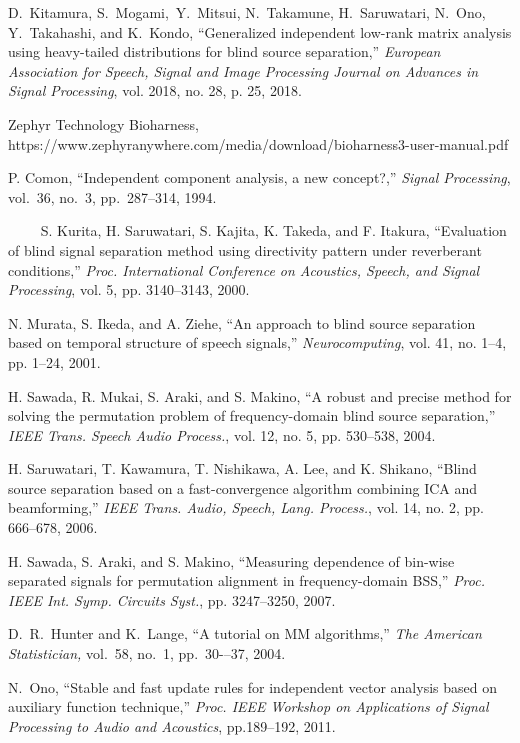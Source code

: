 \documentclass[honka]{nitkagawathesis}%
\begin{document}
\begin{thebibliography}{99}
  D.~Kitamura, S.~Mogami,~Y.~Mitsui, N.~Takamune, H.~Saruwatari, N.~Ono, Y.~Takahashi, and K.~Kondo, 
  ``Generalized independent low-rank matrix analysis using heavy-tailed distributions for blind source separation,''
  {\em European Association for Speech, Signal and Image Processing Journal on Advances in Signal Processing}, vol. 2018, no. 28, p. 25, 2018. 

   Zephyr Technology Bioharness, https://www.zephyranywhere.com/media/download/bioharness3-user-manual.pdf

    P. Comon, ``Independent component analysis, a new concept?,'' 
    {\em Signal Processing}, vol.~36, no.~3, pp.~287--314, 1994.

    S. Kurita, H. Saruwatari, S. Kajita, K. Takeda, and F. Itakura, ``Evaluation of blind signal separation method using directivity pattern under reverberant conditions,'' {\em Proc. International Conference on Acoustics, Speech, and Signal Processing}, vol. 5, pp. 3140--3143, 2000.

    N. Murata, S. Ikeda, and A. Ziehe, ``An approach to blind source separation based on temporal structure of speech signals,'' {\em Neurocomputing}, vol. 41, no. 1--4, pp. 1--24, 2001.

    H. Sawada, R. Mukai, S. Araki, and S. Makino, ``A robust and precise method for solving the permutation problem of frequency-domain blind source separation,'' {\em IEEE Trans. Speech Audio Process.}, vol. 12, no. 5, pp. 530--538, 2004.

    H. Saruwatari, T. Kawamura, T. Nishikawa, A. Lee, and K. Shikano, ``Blind source separation based on a fast-convergence algorithm combining ICA and beamforming,'' {\em IEEE Trans. Audio, Speech, Lang. Process.}, vol. 14, no. 2, pp. 666--678, 2006.

    H. Sawada, S. Araki, and S. Makino, ``Measuring dependence of bin-wise separated signals for permutation alignment in frequency-domain BSS,'' {\em Proc. IEEE Int. Symp. Circuits Syst.}, pp. 3247–3250, 2007.

  D.~R.~Hunter and K.~Lange, ``A tutorial on MM algorithms,'' 
  {\em The American Statistician,} vol.~58, no.~1, pp.~30-–37, 2004.

  N.~Ono,
  ``Stable and fast update rules for independent vector analysis based on auxiliary function technique,''
  {\em Proc. IEEE Workshop on Applications of Signal Processing to Audio and Acoustics}, pp.189--192, 2011.


\end{thebibliography}
\end{document}
